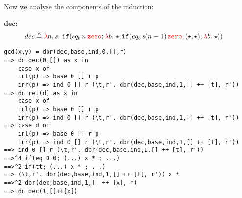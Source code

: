 Now we analyze the components of the induction:

\textbf{dec:}
\begin{align*}
dec &\triangleq \lam{n,s}{}{
      \ifthen{eq_b\,n\,\zero}{\lam{b}{}{\triv}}
      {
        \ifthen{eq_b\,s(n-1)\,\zero}{
          (\triv,\triv)  
        }{\lam{b}{}{\triv}
        }
      }
    }
\end{align*}



\begin{verbatim}
gcd(x,y) = dbr(dec,base,ind,0,[],r) 
==> do dec(0,[]) as x in 
    case x of
    inl(p) => base 0 [] r p 
    inr(p) => ind 0 [] r (\t,r'. dbr(dec,base,ind,1,[] ++ [t], r')) 
==> do ret(d) as x in 
    case x of
    inl(p) => base 0 [] r p 
    inr(p) => ind 0 [] r (\t,r'. dbr(dec,base,ind,1,[] ++ [t], r')) 
==> case d of
    inl(p) => base 0 [] r p 
    inr(p) => ind 0 [] r (\t,r'. dbr(dec,base,ind,1,[] ++ [t], r')) 
==> ind 0 [] r (\t,r'. dbr(dec,base,ind,1,[] ++ [t], r')) 
==>^4 if(eq 0 0; (...) x * ; ...)
==>^2 if(tt; (...) x * ; ...)
==> (\t,r'. dbr(dec,base,ind,1,[] ++ [t], r')) x * 
==>^2 dbr(dec,base,ind,1,[] ++ [x], *)
==> do dec(1,[]++[x]) 
\end{verbatim}

